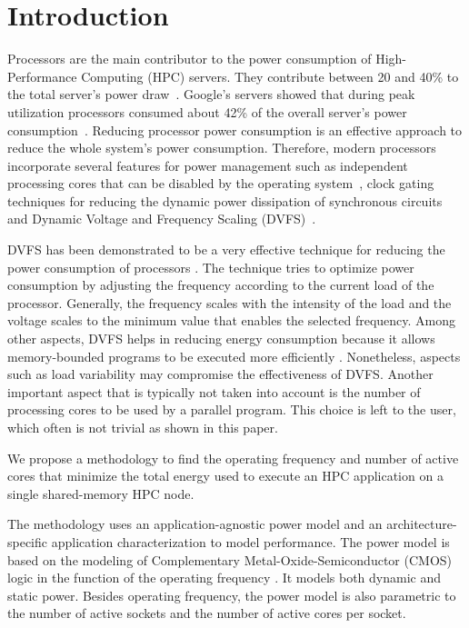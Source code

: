 \section{Introduction} \label{sec:introduction}
Processors are the main contributor to the power consumption of High-Performance Computing (HPC) servers. They contribute between 20 and 40\% to the total server’s power draw~\cite{Fan2007}. Google's servers showed that during peak utilization processors consumed about 42\% of the overall server’s power consumption~\cite{Barroso2007}. Reducing processor power consumption is an effective approach to reduce the whole system's power consumption.  Therefore, modern processors incorporate several features for power management such as independent processing cores that can be disabled by the operating system~\cite{Rotem2012}, clock gating techniques for reducing the dynamic power dissipation of synchronous circuits~\cite{Srinivasan2015} and Dynamic Voltage and Frequency Scaling (DVFS)~\cite{Mittal2014}.

DVFS has been demonstrated to be a very effective technique for reducing the power consumption of processors \cite{Hackenberg2015, Dzhagaryan2014, Hahnel2012, Basmadjian2012, Travers2015, Miyoshi2002, Anghel2011, Pietri2014}. The technique tries to optimize power consumption by adjusting the frequency according to the current load of the processor. Generally, the frequency scales with the intensity of the load and the voltage scales to the minimum value that enables the selected frequency. Among other aspects, DVFS helps in reducing energy consumption because it allows memory-bounded programs to be executed more efficiently \cite{Spiga2006}. Nonetheless, aspects such as load variability may compromise the effectiveness of DVFS. Another important aspect that is typically not taken into account is the number of processing cores to be used by a parallel program. This choice is left to the user, which often is not trivial as shown in this paper.%

We propose a methodology to find the operating frequency and number of active cores that minimize the total energy used to execute an HPC application on a single shared-memory HPC node.

The methodology uses an application-agnostic power model and an architecture-specific application characterization to model performance. The power model is based on the modeling of Complementary Metal-Oxide-Semiconductor (CMOS) logic in the function of the operating frequency \cite{Sarwar1997}. It models both dynamic and static power. Besides operating frequency, the power model is also parametric to the number of active sockets and the number of active cores per socket. 

